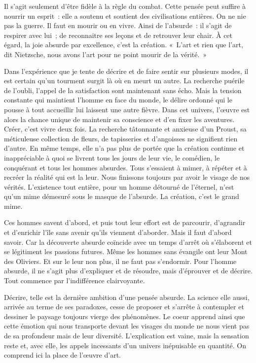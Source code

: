 \documentclass{book}
\begin{document}
Il s'agit seulement d'être fidèle à la règle du combat. Cette pensée peut suffire à nourrir un esprit : elle a soutenu et soutient des civilisations entières. On ne nie pas la guerre. Il faut en mourir ou en vivre. Ainsi de l'absurde : il s'agit de respirer avec lui ; de reconnaitre ses leçons et de retrouver leur chair. À cet égard, la joie absurde par excellence, c'est la création. « L'art et rien que l'art, dit Nietzsche, nous avons l'art pour ne point mourir de la vérité. »

Dans l'expérience que je tente de décrire et de faire sentir sur plusieurs modes, il est certain qu'un tourment surgit là où en meurt un autre. La recherche puérile de l'oubli, l'appel de la satisfaction sont maintenant sans écho. Mais la tension constante qui maintient l'homme en face du monde, le délire ordonné qui le pousse à tout accueillir lui laissent une autre fièvre. Dans cet univers, l'œuvre est alors la chance unique de maintenir sa conscience et d'en fixer les aventures. Créer, c'est vivre deux fois. La recherche tâtonnante et anxieuse d'un Proust, sa méticuleuse collection de fleurs, de tapisseries et d'angoisses ne signifient rien d'autre. En même temps, elle n'a pas plus de portée que la création continue et inappréciable à quoi se livrent tous les jours de leur vie, le comédien, le conquérant et tous les hommes absurdes. Tous s'essaient à mimer, à répéter et à recréer la réalité qui est la leur. Nous finissons toujours par avoir le visage de nos vérités. L'existence tout entière, pour un homme détourné de l'éternel, n'est qu'un mime démesuré sous le masque de l'absurde. La création, c'est le grand mime.

Ces hommes savent d'abord, et puis tout leur effort est de parcourir, d'agrandir et d'enrichir l'île sans avenir qu'ils viennent d'aborder. Mais il faut d'abord savoir. Car la découverte absurde coïncide avec un temps d'arrêt où s'élaborent et se légitiment les passions futures. Même les hommes sans évangile ont leur Mont des Oliviers. Et sur le leur non plus, il ne faut pas s'endormir. Pour l'homme absurde, il ne s'agit plus d'expliquer et de résoudre, mais d'éprouver et de décrire. Tout commence par l'indifférence clairvoyante.

Décrire, telle est la dernière ambition d'une pensée absurde. La science elle aussi, arrivée au terme de ses paradoxes, cesse de proposer et s'arrête à contempler et dessiner le paysage toujours vierge des phénomènes. Le coeur apprend ainsi que cette émotion qui nous transporte devant les visages du monde ne nous vient pas de sa profondeur mais de leur diversité. L'explication est vaine, mais la sensation reste et, avec elle, les appels incessants d'un univers inépuisable en quantité. On comprend ici la place de l'œuvre d'art.
\end{document}

